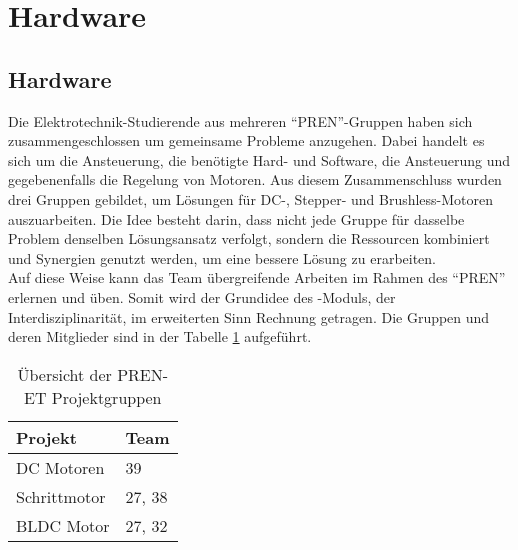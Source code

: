 \ifSTANDALONE
\section{Hardware}
\fi
\ifEMBED
\subsection{Hardware}
\fi
Die Elektrotechnik-Studierende aus mehreren \enquote{PREN}-Gruppen haben sich
zusammengeschlossen um gemeinsame Probleme anzugehen. Dabei handelt es sich
um die Ansteuerung, die benötigte Hard- und Software, die Ansteuerung und gegebenenfalls 
die Regelung von Motoren. Aus diesem Zusammenschluss wurden drei Gruppen
gebildet, um Lösungen für DC-, Stepper- und Brushless-Motoren auszuarbeiten.
Die Idee besteht darin, dass nicht jede Gruppe für dasselbe Problem
denselben Lösungsansatz verfolgt, sondern die Ressourcen kombiniert und
Synergien genutzt werden, um eine bessere Lösung zu erarbeiten. \\
Auf diese Weise kann das Team übergreifende Arbeiten im Rahmen des \enquote{PREN} erlernen und
üben. Somit wird der Grundidee des -Moduls, der Interdisziplinarität, im erweiterten Sinn
Rechnung getragen. Die Gruppen und deren Mitglieder sind in der Tabelle 
\ref{tab:pren-et-overview} aufgeführt.
\begin{table}[h!]
	\centering
	\begin{tabular}{l l}
		Projekt		& Team \\
		\hline
		DC Motoren	& 39 \\
		Schrittmotor	& 27, 38 \\
		BLDC Motor	& 27, 32 \\
	\end{tabular}
	\caption{Übersicht der PREN-ET Projektgruppen}
	\label{tab:pren-et-overview}
\end{table}
